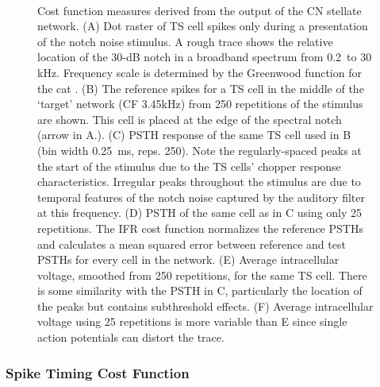 \begin{figure}[pt!]
  \begin{center}
    \\
    \vspace{0.1in}
\end{center}
  \caption{Cost function measures derived from the output of the CN
    stellate network. (A) Dot raster of TS cell spikes only during a
    presentation of the notch noise stimulus. A rough trace shows
    the relative location of the 30-dB notch in a broadband spectrum
    from 0.2~to 30 kHz. Frequency scale is determined by the
    Greenwood function for the cat \cite{Greenwood:1990}. (B) The
    reference spikes for a TS cell in the middle of the `target'
    network (CF 3.45kHz) from 250 repetitions of the stimulus are
    shown. This cell is placed at the edge of the spectral notch
    (arrow in A.). (C) PSTH response of the same TS cell used in B
    (bin width 0.25~ms, reps. 250). Note the regularly-spaced peaks
    at the start of the stimulus due to the TS cells' chopper
    response characteristics. Irregular peaks throughout the
    stimulus are due to temporal features of the notch noise
    captured by the auditory filter at this frequency. (D) PSTH of
    the same cell as in C using only 25 repetitions. The IFR cost
    function normalizes the reference PSTHs and calculates a mean
    squared error between reference and test PSTHs for every cell in
    the network. (E) Average intracellular voltage, smoothed from
    250 repetitions, for the same TS cell. There is some similarity
    with the PSTH in C, particularly the location of the peaks but
    contains subthreshold effects. (F) Average intracellular voltage
    using 25 repetitions is more variable than E since single action
    potentials can distort the trace.}
\label{fig:GA:Costfunctions}
\end{figure}
\clearpage

\subsubsection{Spike Timing Cost Function}\label{sec:GA:spike-timing-cost-fn}


